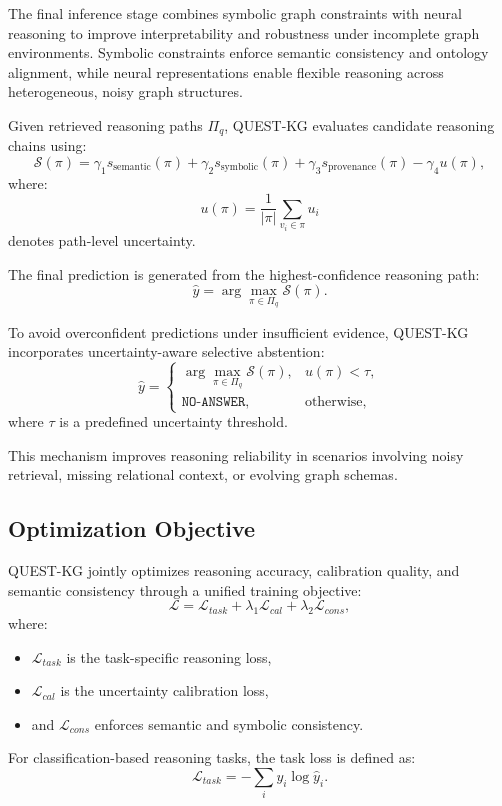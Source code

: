\documentclass[sigconf,review,anonymous]{acmart}
\begin{document}
The final inference stage combines symbolic graph constraints with neural reasoning to improve interpretability and robustness under incomplete graph environments. Symbolic constraints enforce semantic consistency and ontology alignment, while neural representations enable flexible reasoning across heterogeneous, noisy graph structures.

Given retrieved reasoning paths $\Pi_q$, QUEST-KG evaluates candidate reasoning chains using:
\[
\mathcal{S}(\pi)
=
\gamma_1 s_{\text{semantic}}(\pi)
+
\gamma_2 s_{\text{symbolic}}(\pi)
+
\gamma_3 s_{\text{provenance}}(\pi)
-
\gamma_4 u(\pi),
\]
where:
\[
u(\pi)
=
\frac{1}{|\pi|}
\sum_{v_i\in\pi}u_i
\]
denotes path-level uncertainty.

The final prediction is generated from the highest-confidence reasoning path:
\[
\hat{y}
=
\arg\max_{\pi\in\Pi_q}
\mathcal{S}(\pi).
\]

To avoid overconfident predictions under insufficient evidence, QUEST-KG incorporates uncertainty-aware selective abstention:
\[
\hat{y}
=
\begin{cases}
\arg\max_{\pi\in\Pi_q}\mathcal{S}(\pi),
&
u(\pi)<\tau,
\\
\texttt{NO-ANSWER},
&
\text{otherwise},
\end{cases}
\]
where $\tau$ is a predefined uncertainty threshold.

This mechanism improves reasoning reliability in scenarios involving noisy retrieval, missing relational context, or evolving graph schemas.

\subsection{Optimization Objective}

QUEST-KG jointly optimizes reasoning accuracy, calibration quality, and semantic consistency through a unified training objective:
\[
\mathcal{L}
=
\mathcal{L}_{task}
+
\lambda_1\mathcal{L}_{cal}
+
\lambda_2\mathcal{L}_{cons},
\]
where:
\begin{itemize}
    \item $\mathcal{L}_{task}$ is the task-specific reasoning loss,
    \item $\mathcal{L}_{cal}$ is the uncertainty calibration loss,
    \item and $\mathcal{L}_{cons}$ enforces semantic and symbolic consistency.
\end{itemize}

For classification-based reasoning tasks, the task loss is defined as:
\[
\mathcal{L}_{task}
=
-\sum_i y_i\log\hat{y}_i.
\]
\end{document}
